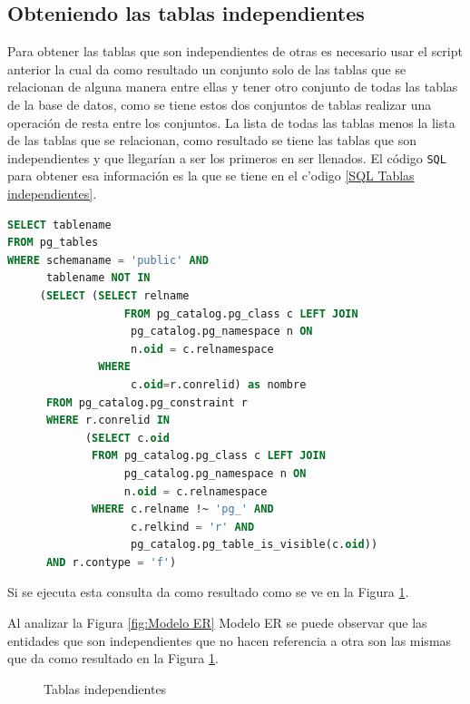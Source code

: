 \subsection{Obteniendo las tablas independientes}
Para obtener las tablas que son independientes de otras es necesario usar el script anterior la cual da como resultado un conjunto solo de las tablas que se relacionan de alguna manera entre ellas y tener otro conjunto de todas las tablas de la base de datos, como se tiene estos dos conjuntos de tablas realizar una operaci\'on de resta entre los conjuntos. La lista de todas las tablas menos la lista de las tablas que se relacionan, como resultado se tiene las tablas que son independientes y que llegar\'ian a ser los primeros en ser llenados.
El c\'odigo \texttt{SQL} para obtener esa informaci\'on es la que se tiene en el c'odigo \ref{SQL Tablas independientes}.
\begin{lstlisting}[caption={Query para obtener tablas independientes},label={SQL Tablas independientes},language=sql]
SELECT tablename
FROM pg_tables
WHERE schemaname = 'public' AND
      tablename NOT IN
     (SELECT (SELECT relname 
      		      FROM pg_catalog.pg_class c LEFT JOIN
                   pg_catalog.pg_namespace n ON 
                   n.oid = c.relnamespace 
              WHERE
                   c.oid=r.conrelid) as nombre
      FROM pg_catalog.pg_constraint r 
      WHERE r.conrelid IN
            (SELECT c.oid
             FROM pg_catalog.pg_class c LEFT JOIN
                  pg_catalog.pg_namespace n ON 
                  n.oid = c.relnamespace 
             WHERE c.relname !~ 'pg_' AND 
                   c.relkind = 'r' AND 
                   pg_catalog.pg_table_is_visible(c.oid))
      AND r.contype = 'f')
\end{lstlisting}
Si se ejecuta esta consulta da como resultado como se ve en la Figura \ref{fig:Tablas independientes}.

Al analizar la Figura \ref{fig:Modelo ER} Modelo ER se puede observar que las entidades que son independientes que no hacen referencia a otra son las mismas que da como resultado en la Figura \ref{fig:Tablas independientes}.
\begin{figure}[H]
\centering
{}
\caption{Tablas independientes} \label{fig:Tablas independientes}
\end{figure}
